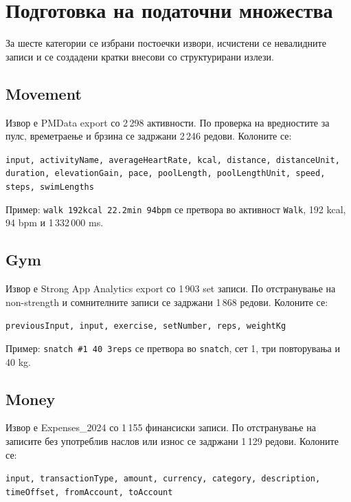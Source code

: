 \chapter{Подготовка на податочни множества}

За шесте категории се избрани постоечки извори, исчистени се невалидните записи и се создадени кратки внесови со структурирани излези.

\section{Movement}

Извор е PMData export со 2\,298 активности.
По проверка на вредностите за пулс, времетраење и брзина се задржани 2\,246 редови.
Колоните се:

\begin{center}
  \small
  \texttt{input, activityName, averageHeartRate, kcal, distance, distanceUnit, duration, elevationGain, pace, poolLength, poolLengthUnit, speed, steps, swimLengths}
\end{center}

Пример: \texttt{walk 192kcal 22.2min 94bpm} се претвора во активност \texttt{Walk}, 192 kcal, 94 bpm и 1\,332\,000 ms.

\section{Gym}

Извор е Strong App Analytics export со 1\,903 set записи.
По отстранување на non-strength и сомнителните записи се задржани 1\,868 редови.
Колоните се:

\begin{center}
  \texttt{previousInput, input, exercise, setNumber, reps, weightKg}
\end{center}

Пример: \texttt{snatch \#1 40 3reps} се претвора во \texttt{snatch}, сет 1, три повторувања и 40 kg.

\section{Money}

Извор е Expenses\_2024 со 1\,155 финансиски записи.
По отстранување на записите без употреблив наслов или износ се задржани 1\,129 редови.
Колоните се:

\begin{center}
  \texttt{input, transactionType, amount, currency, category, description, timeOffset, fromAccount, toAccount}
\end{center}

